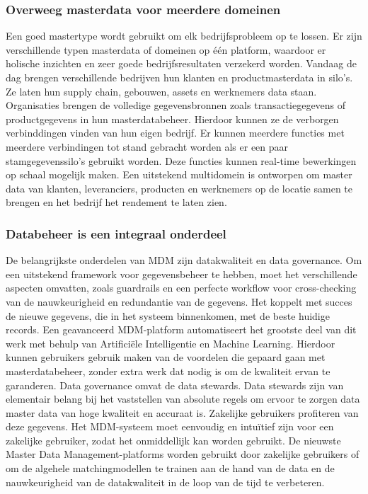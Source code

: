 \subsubsection{Overweeg masterdata voor meerdere domeinen}
Een goed mastertype wordt gebruikt om elk bedrijfsprobleem op te lossen. Er zijn verschillende typen masterdata of domeinen op één platform, waardoor er holische inzichten en zeer goede bedrijfsresultaten verzekerd worden. Vandaag de dag brengen verschillende bedrijven hun klanten en productmasterdata in silo’s. Ze laten hun supply chain, gebouwen, assets en werknemers data staan. Organisaties brengen de volledige gegevensbronnen zoals transactiegegevens of productgegevens in hun masterdatabeheer. Hierdoor kunnen ze de verborgen verbinddingen vinden van hun eigen bedrijf. Er kunnen meerdere functies met meerdere verbindingen tot stand gebracht worden als er een paar stamgegevenssilo’s gebruikt worden. Deze functies kunnen real-time bewerkingen op schaal mogelijk maken. Een uitstekend multidomein is ontworpen om master data van klanten, leveranciers, producten en werknemers op de locatie samen te brengen en het bedrijf het rendement te laten zien. 

\subsubsection{Databeheer is een integraal onderdeel}
De belangrijkste onderdelen van MDM zijn datakwaliteit en data governance. Om een uitstekend framework voor gegevensbeheer te hebben, moet het verschillende aspecten omvatten, zoals guardrails en een perfecte workflow voor cross-checking van de nauwkeurigheid en redundantie van de gegevens. Het koppelt met succes de nieuwe gegevens, die in het systeem binnenkomen, met de beste huidige records. Een geavanceerd MDM-platform automatiseert het grootste deel van dit werk met behulp van Artificiële Intelligentie en Machine Learning. Hierdoor kunnen gebruikers gebruik maken van de voordelen die gepaard gaan met masterdatabeheer, zonder extra werk dat nodig is om de kwaliteit ervan te garanderen. 
Data governance omvat de data stewards. Data stewards zijn van elementair belang bij het vaststellen van absolute regels om ervoor te zorgen data master data van hoge kwaliteit en accuraat is. 
Zakelijke gebruikers profiteren van deze gegevens. Het MDM-systeem moet eenvoudig en intuïtief zijn voor een zakelijke gebruiker, zodat het onmiddellijk kan worden gebruikt. De nieuwste Master Data Management-platforms worden gebruikt door zakelijke gebruikers of om de algehele matchingmodellen te trainen aan de hand van de data en de nauwkeurigheid van de datakwaliteit in de loop van de tijd te verbeteren.

